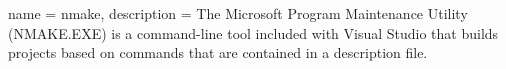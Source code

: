  {
    name = {nmake},
    description = {The Microsoft Program Maintenance Utility (NMAKE.EXE) is a command-line tool included with Visual Studio that builds projects based on commands that are contained in a description file.}
}